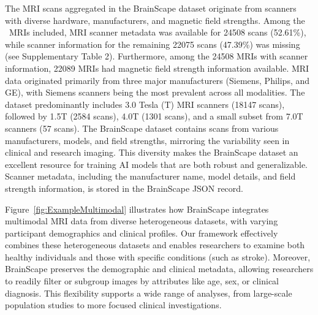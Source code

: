 The MRI scans aggregated in the BrainScape dataset originate from scanners with diverse hardware, manufacturers, and magnetic field strengths.
Among the \TotalNumMRIs\ MRIs included, MRI scanner metadata was available for 24508 scans (52.61\%), 
while scanner information for the remaining 22075 scans (47.39\%) was missing (see Supplementary Table 2). 
Furthermore, among the 24508 MRIs with scanner information, 22089 MRIs had magnetic field strength information available.
MRI data originated primarily from three major manufacturers (Siemens, Philips, and GE), 
with Siemens scanners being the most prevalent across all modalities. 
The dataset predominantly includes 3.0 Tesla (T) MRI scanners (18147 scans), followed by 1.5T (2584 scans), 
4.0T (1301 scans), and a small subset from 7.0T scanners (57 scans). 
The BrainScape dataset contains scans from various manufacturers, models, and field strengths, 
mirroring the variability seen in clinical and research imaging. 
This diversity makes the BrainScape dataset an excellent resource for training AI models that are both robust and generalizable.
Scanner metadata, including the manufacturer name, model details, and field strength information, is stored in the BrainScape JSON record.

Figure~\ref{fig:ExampleMultimodal} illustrates how BrainScape integrates multimodal MRI data 
from diverse heterogeneous datasets, with varying participant demographics and clinical profiles. 
Our framework effectively combines these heterogeneous datasets and enables researchers 
to examine both healthy individuals and those with specific conditions (such as stroke). 
Moreover, BrainScape preserves the demographic and clinical metadata, allowing researchers 
to readily filter or subgroup images by attributes like age, sex, or clinical diagnosis. 
This flexibility supports a wide range of analyses, from large-scale population studies 
to more focused clinical investigations.

